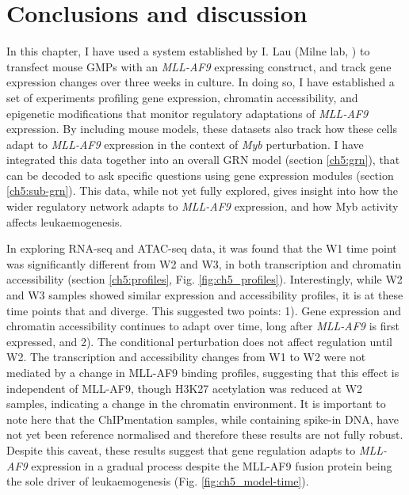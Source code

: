 \clearpage
\section{Conclusions and discussion}

In this chapter, I have used a system established by I. Lau (Milne lab, \cite{lau_role_2022}) to transfect mouse GMPs with an \textit{MLL-AF9} expressing construct, and track gene expression changes over three weeks in culture. In doing so, I have established a set of experiments profiling gene expression, chromatin accessibility, and epigenetic modifications that monitor regulatory adaptations of \textit{MLL-AF9} expression. By including \mybmre{} mouse models, these datasets also track how these cells adapt to \textit{MLL-AF9} expression in the context of \textit{Myb} perturbation. I have integrated this data together into an overall GRN model (section \ref{ch5:grn}), that can be decoded to ask specific questions using gene expression modules (section \ref{ch5:sub-grn}). This data, while not yet fully explored, gives insight into how the wider regulatory network adapts to \textit{MLL-AF9} expression, and how Myb activity affects leukaemogenesis.

In exploring RNA-seq and ATAC-seq data, it was found that the W1 time point was significantly different from W2 and W3, in both transcription and chromatin accessibility (section \ref{ch5:profiles}, Fig. \ref{fig:ch5_profiles}). Interestingly, while W2 and W3 samples showed similar expression and accessibility profiles, it is at these time points that \mybwt{} and \mybmre{} diverge. This suggested two points: 1). Gene expression and chromatin accessibility continues to adapt over time, long after \textit{MLL-AF9} is first expressed, and 2). The conditional \mybmre{} perturbation does not affect regulation until W2. The transcription and accessibility changes from W1 to W2 were not mediated by a change in MLL-AF9 binding profiles, suggesting that this effect is independent of MLL-AF9, though H3K27 acetylation was reduced at W2 samples, indicating a change in the chromatin environment. It is important to note here that the ChIPmentation samples, while containing spike-in DNA, have not yet been reference normalised and therefore these results are not fully robust. Despite this caveat, these results suggest that gene regulation adapts to \textit{MLL-AF9} expression in a gradual process despite the MLL-AF9 fusion protein being the sole driver of leukaemogenesis (Fig. \ref{fig:ch5_model-time}).

